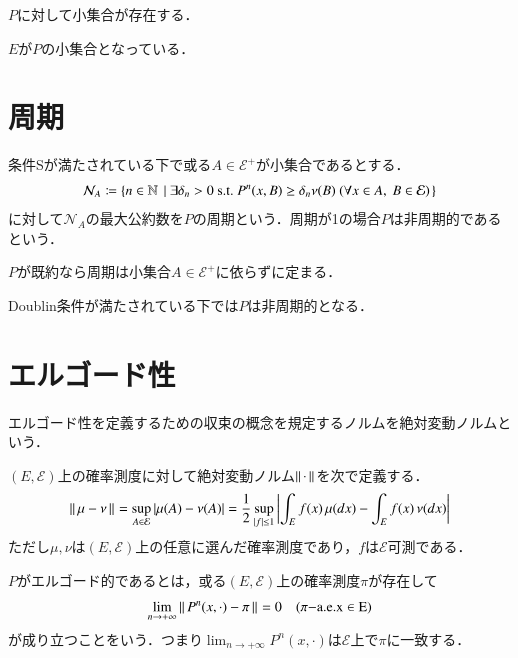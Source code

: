 	\begin{dfn}[条件S]
		$P$に対して小集合が存在する．
	\end{dfn}
	
	\begin{dfn}[Doublin条件]
		$E$が$P$の小集合となっている．
	\end{dfn}
	
\section{周期}
	\begin{dfn}[周期]
		条件Sが満たされている下で或る$A \in \mathcal{E}^+$が小集合であるとする．
		\begin{align}
			\mathcal{N}_A \coloneqq \left\{ n \in \mathbb{N}\ \left|\ \exists \delta_n > 0\ \mathrm{s.t.}\ P^n(x,B) \geq \delta_n \nu(B)\ (\forall x \in A,\ B \in \mathcal{E}) \right.\right\}
		\end{align}
		に対して$\mathcal{N}_A$の最大公約数を$P$の周期という．周期が1の場合$P$は非周期的であるという．
	\end{dfn}
	
	\begin{prp}[周期の一意性]
		$P$が既約なら周期は小集合$A \in \mathcal{E}^+$に依らずに定まる．
	\end{prp}
	
	\begin{prp}
		Doublin条件が満たされている下では$P$は非周期的となる．
	\end{prp}
	
\section{エルゴード性}
	エルゴード性を定義するための収束の概念を規定するノルムを絶対変動ノルムという．
	\begin{dfn}[絶対変動ノルム]
		$(E,\mathcal{E})$上の確率測度に対して絶対変動ノルム$\left\|\, \cdot\, \right\|_{}$を次で定義する．
		\begin{align}
			\left\|\, \mu - \nu\, \right\|_{} = \operatorname*{sup}_{A \in \mathcal{E}} |\mu(A) - \nu(A)| = \frac{1}{2} \operatorname*{sup}_{|f| \leq 1} \left|\int_E f(x)\, \mu(dx) - \int_E f(x)\, \nu(dx)\right|
		\end{align}
		ただし$\mu,\nu$は$(E,\mathcal{E})$上の任意に選んだ確率測度であり，$f$は$\mathcal{E}$可測である．
	\end{dfn}
	
	\begin{dfn}[エルゴード性]
		$P$がエルゴード的であるとは，或る$(E,\mathcal{E})$上の確率測度$\pi$が存在して
		\begin{align}
			\lim_{n \to +\infty} \left\|\, P^n(x,\cdot) - \pi\, \right\|_{} = 0 \quad (\pi \rm{-a.e.}x \in E)
		\end{align}
		が成り立つことをいう．つまり$\displaystyle \lim_{n \to +\infty} P^n(x,\cdot)$は$\mathcal{E}$上で$\pi$に一致する．
	\end{dfn}
	
